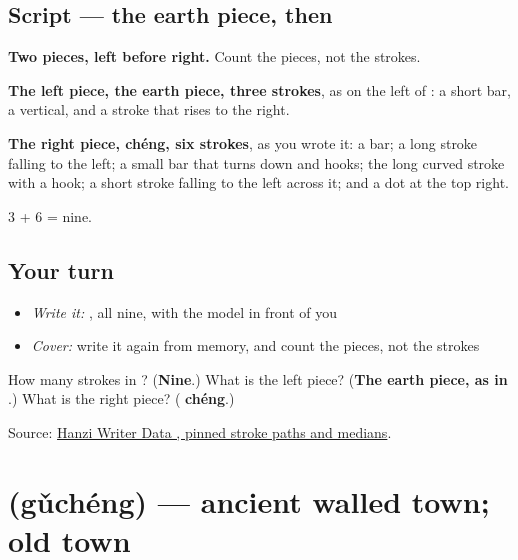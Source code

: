 \subsection*{Script — the earth piece, then }

\begin{quote}
\end{quote}

\textbf{Two pieces, left before right.} Count the pieces, not the strokes.

\textbf{The left piece, the earth piece, three strokes}, as on the left of : a short bar, a vertical, and a stroke that rises to the right.

\textbf{The right piece,  chéng, six strokes}, as you wrote it: a bar; a long stroke falling to the left; a small bar that turns down and hooks; the long curved stroke with a hook; a short stroke falling to the left across it; and a dot at the top right.

3 + 6 = nine.

\subsection*{Your turn}
\begin{itemize}
\raggedright
  \item \emph{Write it:} , all nine, with the model in front of you
  \item \emph{Cover:} write it again from memory, and count the pieces, not the strokes
\end{itemize}

\begin{tcolorbox}[breakable,colback=teal!4,colframe=teal!35!black,title={Before you move on}]
How many strokes in ? (\textbf{Nine}.) What is the left piece? (\textbf{The earth piece, as in }.) What is the right piece? (\textbf{ chéng}.)

Source: \href{https://raw.githubusercontent.com/chanind/hanzi-writer-data/68d10a4b21150cae5e1ebbd223eed289cf32d90c/data/\%E5\%9F\%8E.json}{Hanzi Writer Data , pinned stroke paths and medians}.
\end{tcolorbox}
\section[\texorpdfstring{\zh{古城} (gǔchéng)}{古城 (gǔchéng)}]{ (gǔchéng) — ancient walled town; old town}


